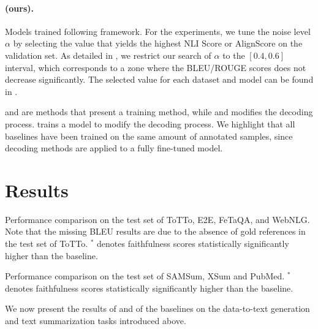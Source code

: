 \paragraph{\scope (ours).} Models trained following \scope framework. For the experiments, we tune the noise level $\alpha$  by selecting the value that yields the highest NLI Score or AlignScore on the validation set. As detailed in , we restrict our search of $\alpha$ to the $[0.4, 0.6]$ interval, which corresponds to a zone where the BLEU/ROUGE scores does not decrease significantly. The selected value for each dataset and model can be found in . 

\cliff and \scope are methods that present a training method, while \cad and \pmi modifies the decoding process. \critic trains a model to modify the decoding process. We highlight that all baselines have been trained on the same amount of annotated samples, since decoding methods are applied to a fully fine-tuned model.

\section{Results}
\label{sec:results}
\begin{table*}[t]
    \centering
    \resizebox{\textwidth}{!}{}
    \caption{Performance comparison on the test set of ToTTo, E2E, FeTaQA, and WebNLG. Note that the missing BLEU results are due to the absence of gold references in the test set of ToTTo. $^*$ denotes faithfulness scores statistically significantly higher than the \sft baseline.}
    \label{tab:results}
    \vspace{-0.4cm}
\end{table*}

\begin{table*}[t]
    \centering
    \resizebox{\textwidth}{!}{}
    \caption{Performance comparison on the test set of SAMSum, XSum and PubMed. $^*$ denotes faithfulness scores statistically significantly higher than the \sft baseline.}
    \label{tab:summ_results}
    \vspace{-0.7cm}
\end{table*}
We now present the results of \scope and of the baselines on the data-to-text generation and text summarization tasks introduced above.



